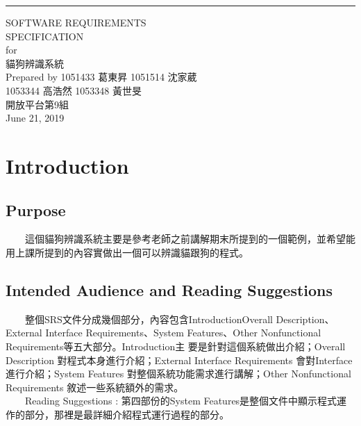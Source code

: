 \documentclass{scrreprt}
\date{}
\begin{document}
\begin{CJK*}{UTF8}{bsmi}
\begin{flushright}
    \rule{16cm}{5pt}\vskip1cm
    \begin{bfseries}
        \Huge{SOFTWARE REQUIREMENTS \\SPECIFICATION}\\
        \vspace{1.9cm}
        for\\
        \vspace{1.9cm}
        貓狗辨識系統\\
        \vspace{1.9cm}
        \Large {Prepared by 1051433 葛東昇 1051514 沈家葳\\1053344 高浩然 1053348 黃世旻}\\
        \vspace{3.8cm}
        開放平台第9組\\
        \vspace{1.9cm}
        June 21, 2019\\
    \end{bfseries}
\end{flushright}

\tableofcontents



\chapter{Introduction}

\section{Purpose}
　　這個貓狗辨識系統主要是參考老師之前講解期末所提到的一個範例，並希望能用上課所提到的內容實做出一個可以辨識貓跟狗的程式。


\section{Intended Audience and Reading Suggestions }
　　整個SRS文件分成幾個部分，內容包含IntroductionOverall Description、External Interface Requirements、System Features、Other Nonfunctional Requirements等五大部分。Introduction主 要是針對這個系統做出介紹；Overall Description 對程式本身進行介紹；External Interface Requirements 會對Interface進行介紹；System Features 對整個系統功能需求進行講解；Other Nonfunctional Requirements 敘述一些系統額外的需求。\\
　　Reading Suggestions : 第四部份的System Features是整個文件中顯示程式運作的部分，那裡是最詳細介紹程式運行過程的部分。

\end{CJK*}
\end{document}
